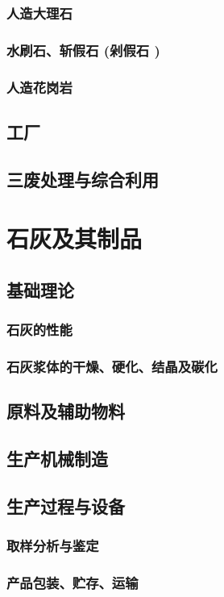 \documentclass[UTF8]{../../ApplicationUniverse}
\begin{document}
        \subsubsection{人造大理石}
        \subsubsection{水刷石、斩假石 (剁假石 )}
        \subsubsection{人造花岗岩}
    \subsection{工厂}
    \subsection{三废处理与综合利用}
\section{石灰及其制品}
    \subsection{基础理论}
        \subsubsection{石灰的性能}
        \subsubsection{石灰浆体的干燥、硬化、结晶及碳化}
    \subsection{原料及辅助物料}
    \subsection{生产机械制造}
    \subsection{生产过程与设备}
        \subsubsection{取样分析与鉴定}
        \subsubsection{产品包装、贮存、运输}
\end{document}
